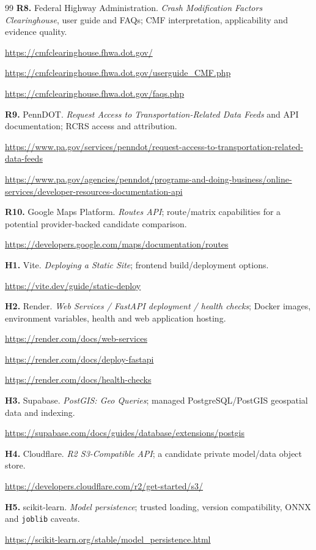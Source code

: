 \documentclass[11pt,a4paper,openany]{report}
\begin{document}
\begin{thebibliography}{99}
\textbf{R8.} Federal Highway Administration. \emph{Crash Modification Factors Clearinghouse}, user guide and FAQs; CMF interpretation, applicability and evidence quality.\par\url{https://cmfclearinghouse.fhwa.dot.gov/}\par\url{https://cmfclearinghouse.fhwa.dot.gov/userguide_CMF.php}\par\url{https://cmfclearinghouse.fhwa.dot.gov/faqs.php}

\textbf{R9.} PennDOT. \emph{Request Access to Transportation-Related Data Feeds} and API documentation; RCRS access and attribution.\par\url{https://www.pa.gov/services/penndot/request-access-to-transportation-related-data-feeds}\par\url{https://www.pa.gov/agencies/penndot/programs-and-doing-business/online-services/developer-resources-documentation-api}

\textbf{R10.} Google Maps Platform. \emph{Routes API}; route/matrix capabilities for a potential provider-backed candidate comparison.\par\url{https://developers.google.com/maps/documentation/routes}

\textbf{H1.} Vite. \emph{Deploying a Static Site}; frontend build/deployment options.\par\url{https://vite.dev/guide/static-deploy}

\textbf{H2.} Render. \emph{Web Services / FastAPI deployment / health checks}; Docker images, environment variables, health and web application hosting.\par\url{https://render.com/docs/web-services}\par\url{https://render.com/docs/deploy-fastapi}\par\url{https://render.com/docs/health-checks}

\textbf{H3.} Supabase. \emph{PostGIS: Geo Queries}; managed PostgreSQL/PostGIS geospatial data and indexing.\par\url{https://supabase.com/docs/guides/database/extensions/postgis}

\textbf{H4.} Cloudflare. \emph{R2 S3-Compatible API}; a candidate private model/data object store.\par\url{https://developers.cloudflare.com/r2/get-started/s3/}

\textbf{H5.} scikit-learn. \emph{Model persistence}; trusted loading, version compatibility, ONNX and \texttt{joblib} caveats.\par\url{https://scikit-learn.org/stable/model_persistence.html}
\end{thebibliography}
\end{document}

